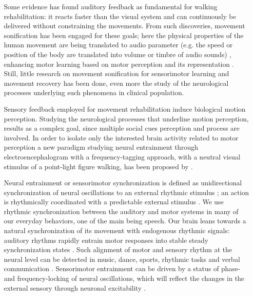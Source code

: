Some evidence has found auditory feedback as fundamental for walking rehabilitation: it reacts faster than the visual system and can continuously be delivered without constraining the movements. From such discoveries, movement sonification has been engaged for these goals; here the physical properties of the human movement are being translated to audio parameter (e.g. the speed or position of the body are translated into volume or timbre of audio sounds) \parencite{Effenberg_2016}, enhancing motor learning based on motor perception and its representation \parencite{Bevilacqua_2016}. \\
Still, little research on movement sonification for sensorimotor learning and movement recovery has been done, even more the study of the neurological processes underlying such phenomena in clinical population.

Sensory feedback employed for movement rehabilitation induce biological motion perception. Studying the neurological processes that underline motion perception, results as a complex goal, since multiple social cues perception and process are involved. In order to isolate only the interested brain activity related to motor perception a new paradigm studying neural entrainment through electroencephalogram with a frequency-tagging approach, with a neutral visual stimulus of a point-light figure walking, has been proposed by \cite{Cracco_2022}. 

Neural entrainment or sensorimotor synchronization is defined as unidirectional synchronization of neural oscillations to an external rhythmic stimulus \parencite{Lakatos_2019, Haegens_2018}; an action is rhythmically coordinated with a predictable external stimulus \parencite{Pressing_1999}. We use rhythmic synchronization between the auditory and motor systems in many of our everyday behaviors, one of the main being speech. Our brain leans towards a natural synchronization of its movement with endogenous rhythmic signals: auditory rhythms rapidly entrain motor responses into stable steady synchronization states \parencite{Thaut_2003}. Such alignment of motor and sensory rhythm at the neural level can be detected in music, dance, sports, rhythmic tasks and verbal communication \parencite{Rosso_2023}. Sensorimotor entrainment can be driven by a status of phase- and frequency-locking of neural oscillations, which will reflect the changes in the external sensory through neuronal excitability \parencite{Lakatos_2005}. 

